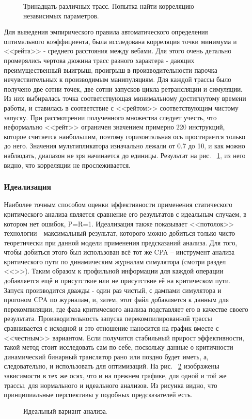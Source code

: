 \documentclass[a4paper,12pt,titlepage]{article}
\newcommand*{\fig}[1]{рис. ~{\ref{fig:#1}}}
\newcommand*{\chp}[1]{<<\nameref{chap:#1}>>}
\begin{document}
\begin{figure}[h]

\caption{Тринадцать различных трасс. Попытка найти корреляцию независимых параметров.}
\label{fig:correlation}
\end{figure}

 Для выведения эмпирического правила автоматического определения оптимального коэффициента, была исследована корреляция точки минимума и <<рейта>> - среднего расстояния между вебами. Для этого очень детально промерялись чертова дюжина трасс разного характера - дающих преимущественный выигрыш, проигрыш в производительности парочка нечувствительных к производимым манипуляциям. Для каждой трассы было получено две сотни точек, две сотни запусков цикла ретрансляции и симуляции. Из них выбиралась точка соответствующая минимальному достигнутому времени работы, и ставилась в соответствие с <<рейтом>> соответствующим чистому запуску. При рассмотрении полученного множества следует учесть, что неформально <<рейт>> ограничен значением примерно 220 инструкций, которое считается наибольшим, поэтому горизонтальная ось простирается только до него. Значения мультипликатора изначально лежали от 0.7 до 10, и как можно наблюдать, диапазон не зря начинается до единицы. Результат на \fig{correlation}, из него видно, что корреляции не прослеживается.

\subsubsection{Идеализация}
Наиболее точным способом оценки эффективности применения статического критического анализа является сравнение его результатов с идеальным случаем, в котором нет ошибок, P=R=1. Идеализация также показывает <<потолок>> технологии - максимальный результат, которого можно добиться только чисто теоретически при данной модели применения предсказаний анализа. Для того, чтобы добиться этого был использован всё тот же CPA -- инструмент анализа критического пути по динамическим журналам симулятора (смотри раздел \chp{CPAcomparison}). Таким образом к профильной информации для каждой операции добавляется ещё и присутствие или не присутствие её на критическом пути. Запуск производится дважды - один раз чистый, с дампами симулятора и прогоном CPA по журналам, и, затем, этот файл добавляется к данным для перекомпиляции, где фаза критического анализа подставляет его в качестве своего результата. Производительность запуска перекомпилированной трассы сравнивается с исходной и это отношение наносится на график вместе с <<честным>> вариантом. Если получится стабильный прирост эффективности, такой метод стоит исследовать сам по себе, поскольку данные о критичности динамический бинарный транслятор рано или поздно будет иметь, а, следовательно, и использовать для оптимизаций. На \fig{ideal} изображены зависимости в тех же осях, что и на прежнем графике, для одной и той же трассы, для нормального и идеального анализов. Из рисунка видно, что принципиальные перспективы у подобных предсказателей есть.
\begin{figure}[h]

\caption{Идеальный вариант анализа.}
\label{fig:ideal}
\end{figure}
\end{document}
